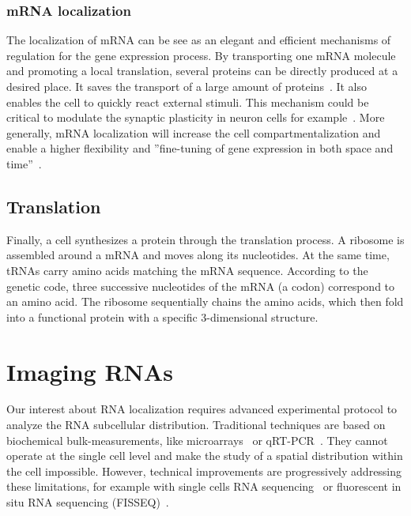 \subsubsection{mRNA localization}

The localization of \ac{mRNA} can be see as an elegant and efficient mechanisms of regulation for the gene expression process.
By transporting one \ac{mRNA} molecule and promoting a local translation, several proteins can be directly produced at a desired place.
It saves the transport of a large amount of proteins~\cite{Medioni_2012}.
It also enables the cell to quickly react external stimuli.
This mechanism could be critical to modulate the synaptic plasticity in neuron cells for example~\cite{jung_axonal_2012}.
More generally, \ac{mRNA} localization will increase the cell compartmentalization and enable a higher flexibility and ''fine-tuning of gene expression in both space and time''~\cite{Medioni_2012}.


\subsection{Translation}
\label{subsec:intro_translation}

Finally, a cell synthesizes a protein through the translation process.
A ribosome is assembled around a \ac{mRNA} and moves along its nucleotides.
At the same time, \ac{tRNA}s carry amino acids matching the \ac{mRNA} sequence.
According to the genetic code, three successive nucleotides of the \ac{mRNA} (a codon) correspond to an amino acid.
The ribosome sequentially chains the amino acids, which then fold into a functional protein with a specific 3-dimensional structure.

\section{Imaging RNAs}
\label{sec:fish}

Our interest about \ac{RNA} localization requires advanced experimental protocol to analyze the \ac{RNA} subcellular distribution.
Traditional techniques are based on biochemical bulk-measurements, like microarrays~\cite{Schena_1995} or qRT-PCR~\cite{bustin_absolute_2000}.
They cannot operate at the single cell level and make the study of a spatial distribution within the cell impossible.
However, technical improvements are progressively addressing these limitations, for example with single cells \ac{RNA} sequencing~\cite{Hedlund_2018} or fluorescent in situ \ac{RNA} sequencing (FISSEQ)~\cite{Church_2014}.

